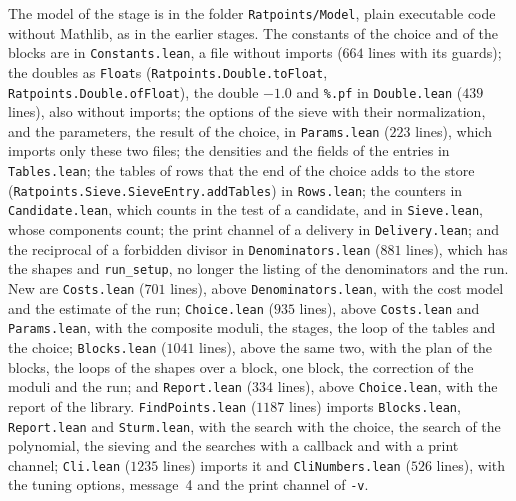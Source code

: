 The model of the stage is in the folder \verb|Ratpoints/Model|, plain executable code without
Mathlib, as in the earlier stages. The constants of the choice and of the blocks are in
\verb|Constants.lean|, a file without imports ($664$ lines with its guards); the doubles as
\verb|Float|s (\verb|Ratpoints.Double.toFloat|, \verb|Ratpoints.Double.ofFloat|), the double $-1.0$
and \verb|%.pf| in \verb|Double.lean| ($439$ lines), also without imports; the options of the sieve
with their normalization, and the parameters, the result of the choice, in \verb|Params.lean| ($223$
lines), which imports only these two files; the densities and the fields of the entries in
\verb|Tables.lean|; the tables of rows that the end of the choice adds to the store
(\verb|Ratpoints.Sieve.SieveEntry.addTables|) in \verb|Rows.lean|; the counters in
\verb|Candidate.lean|, which counts in the test of a candidate, and in \verb|Sieve.lean|, whose
components count; the print channel of a delivery in \verb|Delivery.lean|; and the reciprocal of a
forbidden divisor in \verb|Denominators.lean| ($881$ lines), which has the shapes and
\verb|run_setup|, no longer the listing of the denominators and the run. New are \verb|Costs.lean|
($701$ lines), above \verb|Denominators.lean|, with the cost model and the estimate of the run;
\verb|Choice.lean| ($935$ lines), above \verb|Costs.lean| and \verb|Params.lean|, with the composite
moduli, the stages, the loop of the tables and the choice; \verb|Blocks.lean| ($1041$ lines), above
the same two, with the plan of the blocks, the loops of the shapes over a block, one block, the
correction of the moduli and the run; and \verb|Report.lean| ($334$ lines), above
\verb|Choice.lean|, with the report of the library. \verb|FindPoints.lean| ($1187$ lines) imports
\verb|Blocks.lean|, \verb|Report.lean| and \verb|Sturm.lean|, with the search with the choice, the
search of the polynomial, the sieving and the searches with a callback and with a print channel;
\verb|Cli.lean| ($1235$ lines) imports it and \verb|CliNumbers.lean| ($526$ lines), with the tuning
options, message~4 and the print channel of \verb|-v|.

